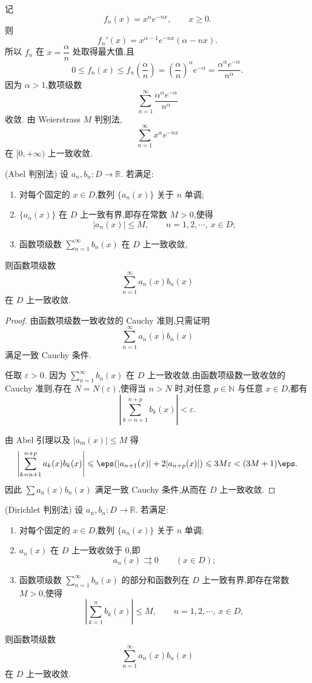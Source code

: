 \begin{solution}
	记
	\[
	f_n(x)=x^{\alpha}e^{-nx},
	\qquad x\geq0.
	\]
	则
	\[
	f_n'(x)=x^{\alpha-1}e^{-nx}(\alpha-nx).
	\]
	所以 $f_n$ 在 $x=\dfrac{\alpha}{n}$ 处取得最大值,且
	\[
	0\leq f_n(x)\leq f_n\left(\frac{\alpha}{n}\right)
	=\left(\frac{\alpha}{n}\right)^{\alpha}e^{-\alpha}
	=\frac{\alpha^{\alpha}e^{-\alpha}}{n^{\alpha}}.
	\]
	因为 $\alpha>1$,数项级数
	\[
	\sum_{n=1}^{\infty}\frac{\alpha^{\alpha}e^{-\alpha}}{n^{\alpha}}
	\]
	收敛. 由 Weierstrass $M$ 判别法,
	\[
	\sum_{n=1}^{\infty}x^{\alpha}e^{-nx}
	\]
	在 $[0,+\infty)$ 上一致收敛.
\end{solution}
\begin{proposition}
	(Abel 判别法)
	设 $a_n,b_n:D\to\mathbb R$. 若满足:
	\begin{enumerate}
		\item 对每个固定的 $x\in D$,数列 $\{a_n(x)\}$ 关于 $n$ 单调;
		\item $\{a_n(x)\}$ 在 $D$ 上一致有界,即存在常数 $M>0$,使得
		\[
		|a_n(x)|\leq M,
		\qquad n=1,2,\cdots,\ x\in D;
		\]
		\item 函数项级数 $\sum\limits_{n=1}^{\infty}b_n(x)$ 在 $D$ 上一致收敛,
	\end{enumerate}
	则函数项级数
	\[
	\sum_{n=1}^{\infty}a_n(x)b_n(x)
	\]
	在 $D$ 上一致收敛.
\end{proposition}

\begin{proof}
	由函数项级数一致收敛的 Cauchy 准则,只需证明
	\[
	\sum_{n=1}^{\infty}a_n(x)b_n(x)
	\]
	满足一致 Cauchy 条件.
	
	任取 $\varepsilon>0$. 因为 $\sum\limits_{n=1}^{\infty}b_n(x)$ 在 $D$ 上一致收敛,由函数项级数一致收敛的 Cauchy 准则,存在 $N=N(\varepsilon)$,使得当 $n>N$ 时,对任意 $p\in\mathbb N$ 与任意 $x\in D$,都有
	\[
	\left|\sum_{k=n+1}^{n+p}b_k(x)\right|<\varepsilon.
	\]

	由 Abel 引理以及 $|a_m(x)|\leq M$ 得
	\[
	\left|\sum_{k=n+1}^{n+p}a_k(x)b_k(x)\right|\leqslant \eps (|a_{n+1}(x)|+ 2 |a_{n+p}(x)|)
	\leqslant 3M\varepsilon <(3M + 1)\eps.
	\]
	因此 $\sum a_n(x)b_n(x)$ 满足一致 Cauchy 条件,从而在 $D$ 上一致收敛.
\end{proof}
\begin{proposition}
	(Dirichlet 判别法)
	设 $a_n,b_n:D\to\mathbb R$. 若满足:
	\begin{enumerate}
		\item 对每个固定的 $x\in D$,数列 $\{a_n(x)\}$ 关于 $n$ 单调;
		\item $a_n(x)$ 在 $D$ 上一致收敛于 $0$,即
		\[
		a_n(x)\rightrightarrows 0
		\qquad (x\in D);
		\]
		\item 函数项级数 $\sum\limits_{n=1}^{\infty}b_n(x)$ 的部分和函数列在 $D$ 上一致有界,即存在常数 $M>0$,使得
		\[
		\left|\sum_{k=1}^{n}b_k(x)\right|\leq M,
		\qquad n=1,2,\cdots,\ x\in D,
		\]
	\end{enumerate}
	则函数项级数
	\[
	\sum_{n=1}^{\infty}a_n(x)b_n(x)
	\]
	在 $D$ 上一致收敛.
\end{proposition}

